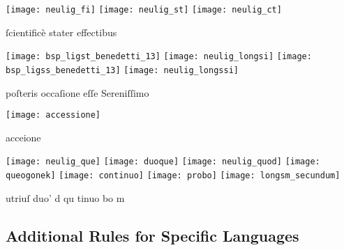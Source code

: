 \begin{example}

\texttt{[image: neulig\_fi]} \quad
\texttt{[image: neulig\_st]} \hspace{40mm}
\texttt{[image: neulig\_ct]}

\vspace{-3mm}
\begin{typeLatin}
ſcientificè     stater     effectibus
\end{typeLatin}

\texttt{[image: bsp\_ligst\_benedetti\_13]} \quad
\texttt{[image: neulig\_longsi]} \quad
\texttt{[image: bsp\_ligss\_benedetti\_13]} \quad
\texttt{[image: neulig\_longssi]}

\vspace{-3mm}
\begin{typeLatin}
poſteris        occaſione          eſſe     Sereniſſimo
\end{typeLatin}

\end{example}

\begin{example}

\texttt{[image: accessione]}

\vspace{-3mm}
\begin{typeLatin}
acceione
\end{typeLatin}

\texttt{[image: neulig\_que]} \quad
\texttt{[image: duoque]} \quad
\texttt{[image: neulig\_quod]} \quad
\texttt{[image: queogonek]} \quad
\texttt{[image: continuo]} \quad
\texttt{[image: probo]} \quad
\texttt{[image: longsm\_secundum]}

\vspace{-3mm}
\begin{typeLatin}
utriuſ     duo'   d   qu    tinuo      bo     m
\end{typeLatin}

\end{example}


\tocspace
\subsection{Additional Rules for Specific Languages}

